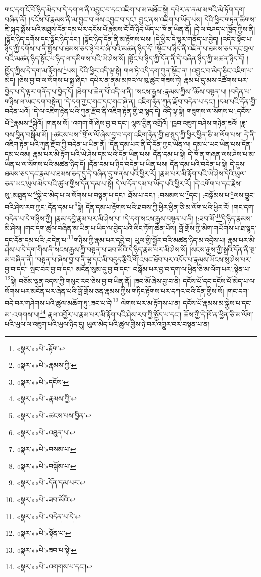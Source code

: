 གང་དག་ངོ་བོ་ཉིད་མེད་པ་དེ་དག་ལ་ནི་འབྱུང་བ་དང་འཇིག་པ་མ་མཐོང་སྟེ། དཔེར་ན་ནམ་མཁའི་མེ་ཏོག་དག་བཞིན་ནོ། །དངོས་པོ་རྣམས་ནི་མ་བྱུང་བ་ལས་འབྱུང་བ་དང་། བྱུང་ནས་འཇིག་པ་ཡོད་པས། དེའི་ཕྱིར་གཏན་ཚིགས་ཇི་སྐད་སྨོས་པའི་མཐུས་དོན་དམ་པར་དངོས་པོ་རྣམས་ངོ་བོ་ཉིད་ཡོད་པ་ཁོ་ན་ཡིན་ནོ། །དེ་ལ་བཤད་པ་ཁྱོད་ཀྱིས་ནི། །སྟོང་ཉིད་དགོས་དང་སྟོང་ཉིད་དང་། །སྟོང་ཉིད་དོན་ནི་མ་རྟོགས་པས། །དེ་ཕྱིར་དེ་ལྟར་གནོད་པ་བྱེད། །འདིར་སྟོང་པ་ཉིད་ཀྱི་དགོས་པ་ནི་སྤྲོས་པ་ཐམས་ཅད་ཉེ་བར་ཞི་བའི་མཚན་ཉིད་དོ། །སྟོང་པ་ཉིད་ནི་འཛིན་པ་ཐམས་ཅད་དང་བྲལ་བའི་མཚན་ཉིད་སྟོང་པ་ཉིད་ལ་དམིགས་པའི་ཡེ་ཤེས་སོ། །སྟོང་པ་ཉིད་ཀྱི་དོན་ནི་དེ་བཞིན་ཉིད་ཀྱི་མཚན་ཉིད་དོ། །ཁྱོད་ཀྱིས་དེ་དག་མ་རྟོགས་\footnote{«སྣར་»«པེ་»རྟོག་}པས། དེའི་ཕྱིར་འདི་ལྟ་སྟེ། གལ་ཏེ་འདི་དག་ཀུན་སྟོང་ན། །འབྱུང་བ་མེད་ཅིང་འཇིག་པ་མེད། །ཅེས་བྱ་བ་ལ་སོགས་པ་སྨྲ་ཞིང་། དཔེར་ན་ནམ་མཁའ་ལ་ཁུ་ཚུར་གཟས་ཏེ། རྣམ་པ་དུ་མས་འཚོགས་པར་བྱེད་པ་དེ་ལྟར་གནོད་པ་བྱེད་དོ། །ཐེག་པ་ཆེན་པོ་འདི་ལ་ནི། །སངས་རྒྱས་:རྣམས་ཀྱིས་\footnote{«སྣར་»«པེ་»རྣམས་ཀྱི་}ཆོས་བསྟན་པ། །བདེན་པ་གཉིས་ལ་ཡང་དག་བསྟེན། །དེ་དག་ཀྱང་གང་དང་གང་ཞེ་ན། འཇིག་རྟེན་ཀུན་རྫོབ་བདེན་པ་དང་། །དམ་པའི་དོན་གྱི་བདེན་པའོ། །དེ་ལ་འཇིག་རྟེན་པའི་ཀུན་རྫོབ་ནི་འཇིག་རྟེན་གྱི་ཐ་སྙད་དེ། འདི་ལྟ་སྟེ། གཟུགས་ལ་སོགས་པ་:དངོས་པོ་\footnote{«སྣར་»«པེ་»དངོས་}རྣམས་\footnote{«སྣར་»«པེ་»རྣམས་ཀྱི་}སྐྱེའོ། །གནས་སོ། །འགག་གོ་ཞེས་བྱ་བ་དང་། ལྷས་བྱིན་འགྲོའོ། །ཁྱབ་འཇུག་བཤེས་གཉེན་ཟའོ། །ཟླ་བས་བྱིན་བསྒོམ་མོ། །:ཚངས་པས་\footnote{«སྣར་»«པེ་»ཚངས་པས་བྱིན་}གྲོལ་ལོ་ཞེས་བྱ་བ་དག་འཇིག་རྟེན་གྱི་ཐ་སྙད་ཀྱི་ཕྱིར་ཕྱིན་ཅི་མ་ལོག་པས། དེ་ནི་འཇིག་རྟེན་པའི་ཀུན་རྫོབ་ཀྱི་བདེན་པ་ཡིན་ནོ། །དོན་དམ་པར་ནི་དེ་དོན་ཀྱང་ཡིན་ལ། དམ་པ་ཡང་ཡིན་པས་དོན་དམ་པའམ། རྣམ་པར་མི་རྟོག་པའི་ཡེ་ཤེས་དམ་པའི་དོན་ཡིན་པས། དོན་དམ་པ་སྟེ། དེ་ཁོ་ན་གཞན་ལས་ཤེས་པ་མ་ཡིན་པ་ལ་སོགས་པའི་མཚན་ཉིད་དོ། །དོན་དམ་པ་ཉིད་བདེན་པ་ཡིན་པས། དོན་དམ་པའི་བདེན་པ་སྟེ། དེ་དུས་ཐམས་ཅད་དང་རྣམ་པ་ཐམས་ཅད་དུ་དེ་བཞིན་དུ་གནས་པའི་ཕྱིར་རོ། །རྣམ་པར་མི་རྟོག་པའི་ཡེ་ཤེས་དེའི་ཡུལ་ཅན་ཡང་ཡུལ་མེད་པའི་ཚུལ་གྱིས་དོན་དམ་པ་སྟེ། དེ་ལ་དོན་དམ་པ་ཡོད་པའི་ཕྱིར་རོ། །དེ་འགོག་པ་དང་རྗེས་སུ་:མཐུན་པ་\footnote{«སྣར་»«པེ་»འཐུན་པ་}སྐྱེ་བ་མེད་པ་ལ་སོགས་པ་བསྟན་པ་དང་། ཐོས་པ་དང་། :བསམས་པ་\footnote{«སྣར་»«པེ་»བསམ་པ་}དང་། :བསྒོམས་པ་\footnote{«སྣར་»«པེ་»བསྒོམ་པ་}ལས་བྱུང་བའི་ཤེས་རབ་ཀྱང་:དོན་དམ་པ་\footnote{«སྣར་»«པེ་»དོན་དམ་པར་}སྟེ། དོན་དམ་པ་རྟོགས་པའི་ཐབས་ཀྱི་ཕྱིར་ཕྱིན་ཅི་མ་ལོག་པའི་ཕྱིར་རོ། །གང་དག་བདེན་པ་དེ་གཉིས་ཀྱི། །རྣམ་དབྱེ་རྣམ་པར་མི་ཤེས་པ། །དེ་དག་སངས་རྒྱས་བསྟན་པ་ནི། །:ཟབ་མོ་\footnote{«སྣར་»«པེ་»ཟབ་མོའི་}དེ་ཉིད་རྣམས་མི་ཤེས། །གང་དག་ཚུལ་བཞིན་མ་ཡིན་པ་ཡིད་ལ་བྱེད་པའི་ལིང་ཏོག་ཆེན་པོས། བློ་གྲོས་ཀྱི་མིག་གཡོགས་པ་ཐ་སྙད་དང་དོན་དམ་པའི་:བདེན་པ་\footnote{«སྣར་»«པེ་»བདེན་པ་དེ་}གཉིས་ཀྱི་རྣམ་པར་དབྱེ་བ། ཡུལ་གྱི་སྦྱོར་བའི་མཚན་ཉིད་མ་འདྲེས་པ། རྣམ་པར་མི་ཤེས་པ་དེ་དག་གིས་ནི་སངས་རྒྱས་ཀྱི་བསྟན་པ་ཟབ་མོའི་དེ་ཉིད་རྣམ་པར་མི་ཤེས་སོ། །སངས་རྒྱས་ཀྱི་སྒྲའི་དོན་ནི་སྔ་མ་བཞིན་ནོ། །བསྟན་པ་ཞེས་བྱ་བ་ནི་ལྷ་དང་མི་བདུད་རྩིའི་གོ་འཕང་ཐོབ་པར་འདོད་པ་རྣམས་ཡོངས་སུ་ཤེས་པར་བྱ་བ་དང་། སྤང་བར་བྱ་བ་དང་། མངོན་སུམ་དུ་བྱ་བ་དང་། བསྒོམ་པར་བྱ་བ་དག་ལ་ཕྱིན་ཅི་མ་ལོག་པར་:སྟེན་པ་\footnote{«སྣར་»«པེ་»སྟོན་པ་}སྟེ། བཅོམ་ལྡན་འདས་ཀྱི་གསུང་རབ་ཅེས་བྱ་བ་ཡིན་ནོ། །ཟབ་མོ་ཞེས་བྱ་བ་ནི། དངོས་པོ་དང་དངོས་པོ་མེད་པ་ལ་སོགས་པར་མངོན་པར་ཞེན་པའི་བློ་གྲོས་ཅན་རྣམས་ཀྱིས་གཏིང་རྟོགས་པར་དཀའ་བའི་དོན་གྱིས་སོ། །གང་དག་བདེ་བར་གཤེགས་པའི་ཚུལ་མཆོག་ཏུ་:ཟབ་པ་དེ།\footnote{«སྣར་»«པེ་»ཟབ་པ་སྟེ།} ལེགས་པར་མ་རྟོགས་པ་ན། དངོས་པོ་རྣམས་མ་སྐྱེས་པ་དང་མ་:འགགས་པ།\footnote{«སྣར་»«པེ་»འགགས་པ་དང་།} རྣལ་འབྱོར་པ་རྣམ་པར་མི་རྟོག་པའི་ཤེས་རབ་ཀྱི་སྤྱོད་པ་དང་། ཆོས་ཀྱི་དེ་ཁོ་ན་ཕྱིན་ཅི་མ་ལོག་པའི་ཡུལ་ལ་འཇུག་པའི་ཡུལ་ཉིད་དུ། ཡུལ་མེད་པའི་ཚུལ་གྱིས་ཉེ་བར་འགྱུར་བར་བསྟན་པ་ན། 
